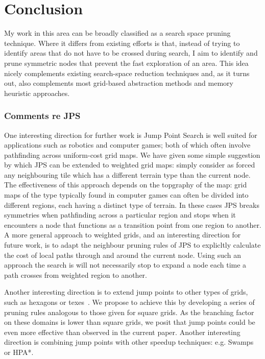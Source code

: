 \chapter{Conclusion}
\label{cha::conclusion}
My work in this area can be broadly classified as a search space pruning
technique. Where it differs from existing efforts is that, instead of trying to
identify areas that do not have to be crossed during search, I aim to identify
and prune symmetric nodes that prevent the fast exploration of an area. This
idea nicely complements existing search-space reduction techniques and, as it
turns out, also complements most grid-based abstraction methods and memory
heuristic approaches.

\subsection{Comments re JPS}
One interesting direction for further work is Jump Point Search is well suited
for applications such as robotics and computer games; both of which often
involve pathfinding across uniform-cost grid maps.  We have given some simple
suggestion by which JPS can be extended to weighted grid maps: simply consider
as forced any neighbouring tile which has a different terrain type than the
current node. The effectiveness of this approach depends on the topgraphy of
the map: grid maps of the type typically found in computer games can often be
divided into different regions, each having a distinct type of terrain. In
these cases JPS breaks symmetries when pathfinding across a particular region
and stops when it encounters a node that functions as a transition point from
one region to another. A more general approach to weighted grids, and an
interesting direction for future work, is to adapt the neighbour pruning rules
of JPS to explicltly calculate the cost of local paths through and around the
current node.  Using such an approach the search is will not necessarily stop
to expand a node each time a path crosses from weighted region to another.

Another interesting direction is to extend jump points to other types of
grids, such as hexagons or texes~\citep{yap02}. We propose to achieve this by
developing  a series of pruning rules analogous to those given for square
grids.  As the branching factor on these domains is lower than square grids,
we posit that jump points could be even more effective than observed in the
current paper.  Another interesting direction is combining jump points with
other speedup techniques: e.g. Swamps or HPA*.
